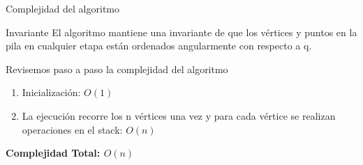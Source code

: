 \documentclass[aspectratio=169,xcolor=dvipsnames, t]{beamer}
\begin{document}
\begin{frame}{Complejidad del algoritmo}
  \begin{block}{Invariante}
    El algoritmo mantiene una invariante de que los vértices y puntos en la pila en cualquier etapa están ordenados angularmente con respecto a q.
  \end{block}    
  \vspace{0.5cm}
  Revisemos paso a paso la complejidad del algoritmo
  \begin{enumerate}
  \item Inicialización: $O(1)$
  \item La ejecución recorre los n vértices una vez y para cada vértice se realizan operaciones en el stack: $O(n)$
  \end{enumerate}
  \begin{center}
    \textbf{Complejidad Total: $O(n)$}
  \end{center}
\end{frame}



\makefinalpage
\end{document}

